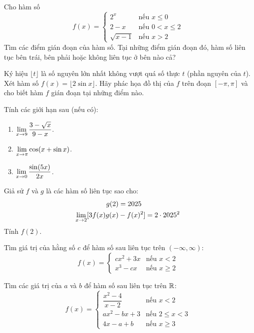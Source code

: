 \begin{exercise}
	Cho hàm số
	\[
		f(x) = \begin{cases}
			2^x & \text{nếu } x \le 0 \\
			2-x & \text{nếu } 0 < x \le 2 \\
			\sqrt{x-1} & \text{nếu } x > 2
		\end{cases}
	\]
	Tìm các điểm gián đoạn của hàm số. Tại những điểm gián đoạn đó, hàm số liên tục bên trái, bên phải hoặc không liên tục ở bên nào cả?
\end{exercise}

\begin{exercise}
	Ký hiệu \( \lfloor t \rfloor \) là số nguyên lớn nhất không vượt quá số thực \( t \) (phần nguyên của \( t \)). Xét hàm số \( f(x) = \lfloor 2\sin x \rfloor \). Hãy phác họa đồ thị của \( f \) trên đoạn \( [-\pi, \pi] \) và cho biết hàm \( f \) gián đoạn tại những điểm nào.
\end{exercise}

\begin{exercise}
	Tính các giới hạn sau (nếu có):
	\begin{enumerate}[label=(\alph*)]
		\item \( \lim\limits_{x \to 9} \dfrac{3 - \sqrt{x}}{9-x} \).
		\item \( \lim\limits_{x \to \pi} \cos(x + \sin x) \).
		\item \( \lim\limits_{x \to 0} \dfrac{\sin(5x)}{2x} \).
	\end{enumerate}
\end{exercise}

\begin{exercise}
    Giả sử \( f \) và \( g \) là các hàm số liên tục sao cho:
    \begin{align*}
        g(2) &= 2025 \\
        \lim\limits_{x \to 2} [3 f(x) g(x) &- f(x)^2] = 2 \cdot 2025^2
    \end{align*}
    Tính \( f(2) \).
\end{exercise}

\begin{exercise}
	Tìm giá trị của hằng số \( c \) để hàm số sau liên tục trên \( (-\infty, \infty) \):
	\[
		f(x) = \begin{cases}
			cx^2 + 3x & \text{nếu } x < 2 \\
			x^3 - cx & \text{nếu } x \ge 2
		\end{cases}
	\]
\end{exercise}

\begin{exercise}
	Tìm các giá trị của \( a \) và \( b \) để hàm số sau liên tục trên \( \mathbb{R} \):
	\[
		f(x) = \begin{cases}
			\dfrac{x^2-4}{x-2} & \text{nếu } x < 2 \\
			ax^2 - bx + 3 & \text{nếu } 2 \le x < 3 \\
			4x - a + b & \text{nếu } x \ge 3
		\end{cases}
	\]
\end{exercise}

